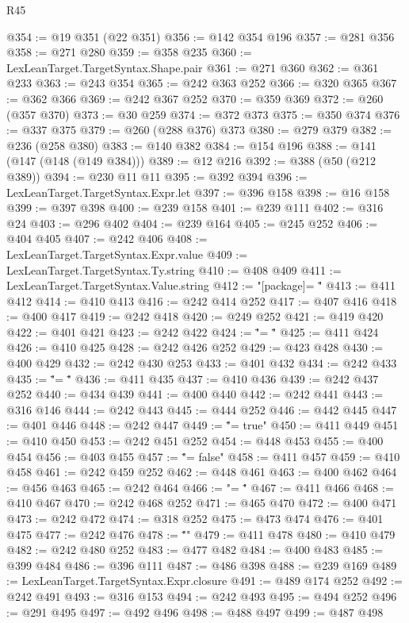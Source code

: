\begin{lexlean}{R45}
\begin{coremodule}
@354 := @19 @351 (@22 @351)
@356 := @142 @354 @196
@357 := @281 @356
@358 := @271 @280
@359 := @358 @235
@360 := LexLeanTarget.TargetSyntax.Shape.pair
@361 := @271 @360
@362 := @361 @233
@363 := @243 @354
@365 := @242 @363 @252
@366 := @320 @365
@367 := @362 @366
@369 := @242 @367 @252
@370 := @359 @369
@372 := @260 (@357 @370)
@373 := @30 @259
@374 := @372 @373
@375 := @350 @374
@376 := @337 @375
@379 := @260 (@288 @376) @373
@380 := @279 @379
@382 := @236 (@258 @380)
@383 := @140 @382
@384 := @154 @196
@388 := @141 (@147 (@148 (@149 @384)))
@389 := @12 @216
@392 := @388 (@50 (@212 @389))
@394 := @230 @11 @11
@395 := @392 @394
@396 := LexLeanTarget.TargetSyntax.Expr.let
@397 := @396 @158
@398 := @16 @158
@399 := @397 @398
@400 := @239 @158
@401 := @239 @111
@402 := @316 @24
@403 := @296 @402
@404 := @239 @164
@405 := @245 @252
@406 := @404 @405
@407 := @242 @406
@408 := LexLeanTarget.TargetSyntax.Expr.value
@409 := LexLeanTarget.TargetSyntax.Ty.string
@410 := @408 @409
@411 := LexLeanTarget.TargetSyntax.Value.string
@412 := "[package]\nname = \""
@413 := @411 @412
@414 := @410 @413
@416 := @242 @414 @252
@417 := @407 @416
@418 := @400 @417
@419 := @242 @418
@420 := @249 @252
@421 := @419 @420
@422 := @401 @421
@423 := @242 @422
@424 := "\"\nversion = \""
@425 := @411 @424
@426 := @410 @425
@428 := @242 @426 @252
@429 := @423 @428
@430 := @400 @429
@432 := @242 @430 @253
@433 := @401 @432
@434 := @242 @433
@435 := "\"\nedition = \""
@436 := @411 @435
@437 := @410 @436
@439 := @242 @437 @252
@440 := @434 @439
@441 := @400 @440
@442 := @242 @441
@443 := @316 @146
@444 := @242 @443
@445 := @444 @252
@446 := @442 @445
@447 := @401 @446
@448 := @242 @447
@449 := "\"\npublish = true"
@450 := @411 @449
@451 := @410 @450
@453 := @242 @451 @252
@454 := @448 @453
@455 := @400 @454
@456 := @403 @455
@457 := "\"\npublish = false"
@458 := @411 @457
@459 := @410 @458
@461 := @242 @459 @252
@462 := @448 @461
@463 := @400 @462
@464 := @456 @463
@465 := @242 @464
@466 := "\n\n[lib]\npath = \""
@467 := @411 @466
@468 := @410 @467
@470 := @242 @468 @252
@471 := @465 @470
@472 := @400 @471
@473 := @242 @472
@474 := @318 @252
@475 := @473 @474
@476 := @401 @475
@477 := @242 @476
@478 := "\"\n{}\n"
@479 := @411 @478
@480 := @410 @479
@482 := @242 @480 @252
@483 := @477 @482
@484 := @400 @483
@485 := @399 @484
@486 := @396 @111
@487 := @486 @398
@488 := @239 @169
@489 := LexLeanTarget.TargetSyntax.Expr.closure
@491 := @489 @174 @252
@492 := @242 @491
@493 := @316 @153
@494 := @242 @493
@495 := @494 @252
@496 := @291 @495
@497 := @492 @496
@498 := @488 @497
@499 := @487 @498

\end{coremodule}
\end{lexlean}

